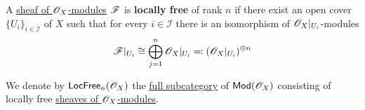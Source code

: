 \documentclass[../../../main]{subfiles}
\begin{document}
\begin{definition} \label{def:locally-free-sheaf}
  A \hyperref[def:sheaf-of-modules]{sheaf of \(\mathscr{O}_{X}\)-modules} \(\mathscr{F}\) is \textbf{locally free} of rank \(n\) if there exist an open cover \(\{U_{i}\}_{i \in \mathcal{I}}\) of \(X\) such that for every \(i \in \mathcal{I}\) there is an isomorphism of \(\mathscr{O}_{X}|_{U_{i}}\)-modules
  \begin{equation*}
    \mathscr{F}|_{U_{i}} \cong \bigoplus_{j=1}^{n} \mathscr{O}_{X}|_{U_{i}} \eqcolon (\mathscr{O}_{X}|_{U_{i}})^{\oplus n}
  \end{equation*}

  We denote by \(\mathsf{LocFree}_{n}(\mathscr{O}_{X})\) the \hyperref[def:subcategory]{full subcategory} of \(\mathsf{Mod}(\mathscr{O}_{X})\) consisting of locally free \hyperref[def:sheaf-of-modules]{sheaves of \(\mathscr{O}_{X}\)-modules}.
\end{definition}
\end{document}
